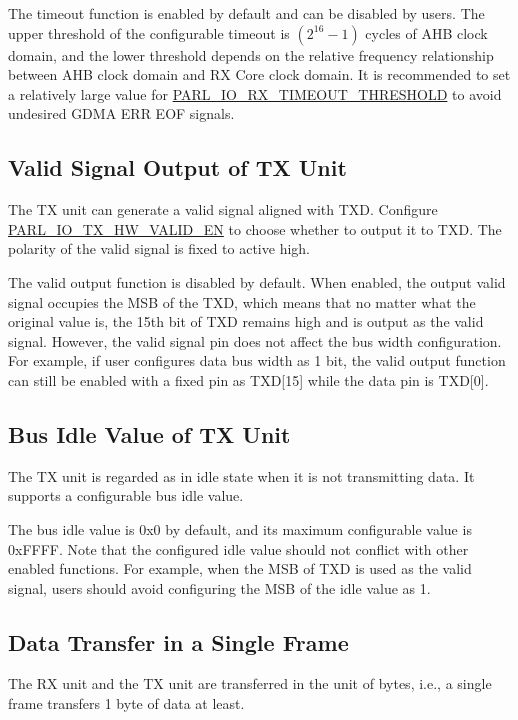\documentclass[main\_\_EN.tex]{subfiles}
\begin{document}
The timeout function is enabled by default and can be disabled by users. The upper threshold of the configurable timeout is \begin{math} (2^{16}-1) \end{math} cycles of AHB clock domain, and the lower threshold depends on the relative frequency relationship between AHB clock domain and RX Core clock domain. It is recommended to set a relatively large value for \hyperref[fielddesc:PARLIORXTIMEOUTTHRESHOLD]{PARL\_IO\_RX\_TIMEOUT\_THRESHOLD} to avoid undesired GDMA ERR EOF signals.

\subsection{Valid Signal Output of TX Unit }
The TX unit can generate a valid signal aligned with TXD. Configure \hyperref[fielddesc:PARLIOTXHWVALIDEN]{PARL\_IO\_TX\_HW\_VALID\_EN} to choose whether to output it to TXD. The polarity of the valid signal is fixed to active high.

The valid output function is disabled by default. When enabled, the output valid signal occupies the MSB of the TXD, which means that no matter what the original value is, the 15th bit of TXD remains high and is output as the valid signal. However, the valid signal pin does not affect the bus width configuration. For example, if user configures data bus width as 1 bit, the valid output function can still be enabled with a fixed pin as TXD[15] while the data pin is TXD[0].


\subsection{Bus Idle Value of TX Unit}
The TX unit is regarded as in idle state when it is not transmitting data. It supports a configurable bus idle value.

The bus idle value is 0x0 by default, and its maximum configurable value is 0xFFFF. Note that the configured idle value should not conflict with other enabled functions. For example, when the MSB of TXD is used as the valid signal, users should avoid configuring the MSB of the idle value as 1.

\subsection{Data Transfer in a Single Frame}
The RX unit and the TX unit are transferred in the unit of bytes, i.e., a single frame transfers 1 byte of data at least.
\end{document}
